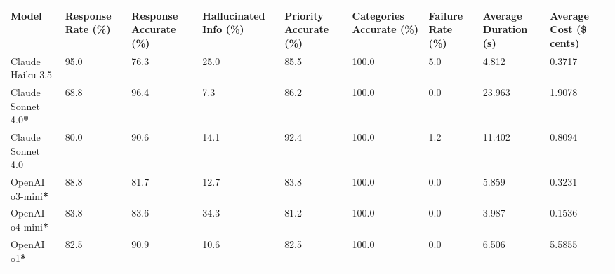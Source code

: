 \begin{table}[H]
    \centering
    \footnotesize
    \begin{tabularx}{\textwidth}{Xp{1.1cm}p{1.25cm}p{1.6cm}p{1.3cm}p{1.3cm}p{1.3cm}p{1.3cm}p{1.3cm}}
        \toprule
        Model                            & Response \newline Rate (\%) & Response \newline Accurate (\%) & Hallucinated Info (\%) & Priority Accurate (\%) & Categories Accurate (\%) & Failure Rate (\%) & Average \newline Duration (s) & Average Cost \newline (\$ cents) \\
        \midrule
        \rowcolor[gray]{0.9}
        Claude Haiku 3.5                 & 95.0                        & 76.3                            & 25.0                   & 85.5                   & 100.0                    & 5.0               & 4.812                         & 0.3717                           \\
        Claude Sonnet 4.0\textbf{*}      & 68.8                        & 96.4                            & 7.3                    & 86.2                   & 100.0                    & 0.0               & 23.963                        & 1.9078                           \\
        \rowcolor[gray]{0.9}
        Claude Sonnet 4.0                & 80.0                        & 90.6                            & 14.1                   & 92.4                   & 100.0                    & 1.2               & 11.402                        & 0.8094                           \\
        OpenAI o3-mini\textbf{*}         & 88.8                        & 81.7                            & 12.7                   & 83.8                   & 100.0                    & 0.0               & 5.859                         & 0.3231                           \\
        \rowcolor[gray]{0.9}
        OpenAI o4-mini\textbf{*}         & 83.8                        & 83.6                            & 34.3                   & 81.2                   & 100.0                    & 0.0               & 3.987                         & 0.1536                           \\
        OpenAI o1\textbf{*}              & 82.5                        & 90.9                            & 10.6                   & 82.5                   & 100.0                    & 0.0               & 6.506                         & 5.5855                           \\

\end{tabularx}
\end{table}
